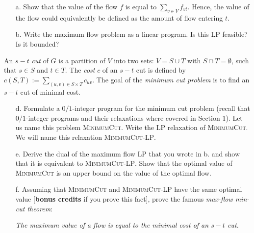\documentclass[11pt]{article}
\theoremstyle{remark}
\begin{document}
\begin{itemize}
    \item[a.] Show that the value of the flow $f$ is equal to $\sum_{v\in V}
        f_{vt}$. Hence, the value of the flow could equivalently be defined as
        the amount of flow entering $t$.
    \item[b.] Write the maximum flow problem as a linear program. Is this LP
        feasible? Is it bounded?
\end{itemize}

An $s-t$ \emph{cut} of $G$ is a partition of $V$ into two sets: $V = S\cup T$
with $S\cap T = \emptyset$, such that $s\in S$ and $t\in T$. The \emph{cost}
$c$ of an $s-t$ cut is defined by $c(S, T) := \sum_{(u,v)\in S\times T}
c_{uv}$. The goal of the \emph{minimum cut problem} is to find an $s-t$ cut of
minimal cost.

\begin{itemize}
    \item[d.] Formulate a $0/1$-integer program for the minimum cut problem
        (recall that $0/1$-integer programs and their relaxations where covered
        in Section 1). Let us name this problem \textsc{MinimumCut}. Write the
        LP relaxation of \textsc{MinimumCut}. We will name this relaxation
        \textsc{MinimumCut-LP}.
    \item[e.] Derive the dual of the maximum flow LP that you wrote in b. and
        show that it is equivalent to \textsc{MinimumCut-LP}. Show that the
        optimal value of \textsc{MinimumCut} is an upper bound on the value of
        the optimal flow.
    \item[f.] Assuming that \textsc{MinimumCut} and \textsc{MinimumCut-LP} have
        the same optimal value [\textbf{bonus credits} if you prove this fact],
        prove the famous \emph{max-flow min-cut theorem}:
        \begin{center}
            \emph{The maximum value of a flow is equal to the minimal cost of
            an $s-t$ cut.}
        \end{center}
\end{itemize}
\end{document}
